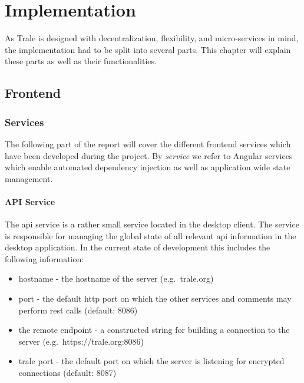 

\chapter{Implementation}\label{ch:implementation}
As Trale is designed with decentralization, flexibility, and micro-services in mind, the implementation had to be split
into several parts.
This chapter will explain these parts as well as their functionalities.

\section{Frontend}\label{sec:frontend}

\subsection{Services}\label{subsec:services}

The following part of the report will cover the different frontend services which have been developed during the
project.
By \textit{service} we refer to Angular services which enable automated dependency injection as well as application
wide state management.

\subsubsection{API Service}\label{subsubsec:api-service}

The \ac{api} service is a rather small service located in the desktop client.
The service is responsible for managing the global state of all relevant \ac{api} information in the desktop
application.
In the current state of development this includes the following information:

\begin{itemize}\setlength\itemsep{-0.5em}
    \item hostname - the hostname of the server (e.g.\ trale.org)
    \item port - the default \ac{http} port on which the other services and comments may perform \ac{rest} calls
        (default: 8086)
    \item the remote endpoint - a constructed string for building a connection to the server
        (e.g.\ https://trale.org:8086)
    \item trale port - the default port on which the server is listening for encrypted connections (default: 8087)
\end{itemize}

